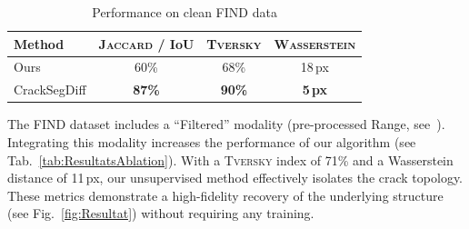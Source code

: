 \documentclass[conference]{IEEEtran}
\begin{document}


\begin{table}[h]
    \centering
    \caption{Performance on clean FIND data}
    \label{tab:ResultatsClean}
    \begin{tabular}{lccc}
        \toprule
        Method & \textsc{Jaccard} / IoU & \textsc{Tversky} & \textsc{Wasserstein} \\
        \midrule
        Ours  & 60\% & 68\% & 18\,px \\
        \midrule
        CrackSegDiff & \textbf{87\%} & \textbf{90\%} & \textbf{5\,px} \\
        \bottomrule
    \end{tabular}
\end{table}

The FIND dataset includes a ``Filtered'' modality (pre-processed Range, see~\cite{FIND2022}). Integrating this modality increases the performance of our algorithm (see Tab.~\ref{tab:ResultatsAblation}).
With a \textsc{Tversky} index of 71\% and a Wasserstein distance of 11\,px, our unsupervised method effectively isolates the crack topology. These metrics demonstrate a high-fidelity recovery of the underlying structure (see Fig.~\ref{fig:Resultat}) without requiring any training.
\end{document}

